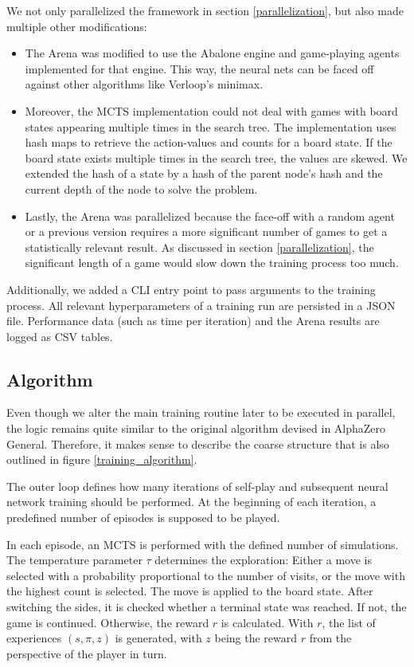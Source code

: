 We not only parallelized the framework  in section \ref{parallelization}, but also made multiple other modifications:
\begin{itemize}
    \item The Arena was modified to use the Abalone engine \cite{claussen_abalone_2021} and game-playing agents implemented for that engine. This way, the neural nets can be faced off against other algorithms like Verloop's minimax.
    \item Moreover, the MCTS implementation could not deal with games with board states appearing multiple times in the search tree. The implementation uses hash maps to retrieve the action-values and counts for a board state. If the board state exists multiple times in the search tree, the values are skewed. We extended the hash of a state by a hash of the parent node's hash and the current depth of the node to solve the problem.
    \item Lastly, the Arena was parallelized because the face-off with a random agent or a previous version requires a more significant number of games to get a statistically relevant result. As discussed in section \ref{parallelization}, the significant length of a game would slow down the training process too much.
\end{itemize}

Additionally, we added a CLI entry point to pass arguments to the training process. All relevant hyperparameters of a training run are persisted in a JSON file. Performance data (such as time per iteration) and the Arena results are logged as CSV tables.

\subsection{Algorithm}
Even though we alter the main training routine later to be executed in parallel, the logic remains quite similar to the original algorithm devised in AlphaZero General. Therefore, it makes sense to describe the coarse structure that is also outlined in figure \ref{training_algorithm}.

The outer loop defines how many iterations of self-play and subsequent neural network training should be performed. At the beginning of each iteration, a predefined number of episodes is supposed to be played.

In each episode, an MCTS is performed with the defined number of simulations. The temperature parameter $\tau$ determines the exploration: Either a move is selected with a probability proportional to the number of visits, or the move with the highest count is selected. The move is applied to the board state. After switching the sides, it is checked whether a terminal state was reached. If not, the game is continued. Otherwise, the reward $r$ is calculated. With $r$, the list of experiences $(s, \pi, z)$ is generated, with $z$ being the reward $r$ from the perspective of the player in turn.

